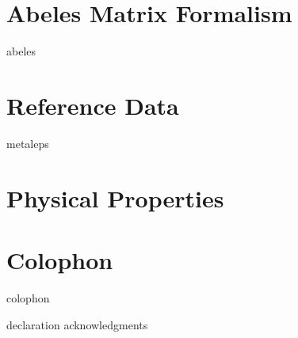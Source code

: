 \documentclass[12pt,a4paper,titlepage,onecolumn]{report}
\begin{document}
\section{Abeles Matrix Formalism} \label{ch:abeles}
{abeles}
\section{Reference Data} \label{ch:reference}
{metaleps}
\section{Physical Properties}
\label{ref:physicalproperties}
\section{Colophon}
{colophon}




{declaration}
{acknowledgments}
\end{document}
